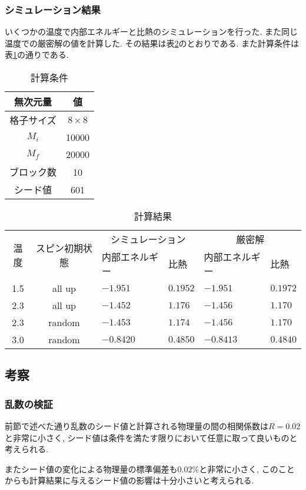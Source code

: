 \subsubsection{シミュレーション結果}
いくつかの温度で内部エネルギーと比熱のシミュレーションを行った.
また同じ温度での厳密解の値を計算した.
その結果は表\ref{tab:5a3}のとおりである.
また計算条件は表\ref{tab:5a2}の通りである.
\begin{table}[h]
\caption{計算条件}
\label{tab:5a2}
\centering
\begin{tabular}{cc}
\hline
無次元量&値\\
\hline \hline
格子サイズ&$8\times 8$\\
$M_i$&10000\\
$M_f$&20000\\
ブロック数&10\\
シード値&601\\
\hline
\end{tabular}
\end{table}
\begin{table}[h]
\caption{計算結果}
\label{tab:5a3}
\centering
\begin{tabular}{cc|ll|ll}
\hline
\multirow{2}{*}{温度}&\multirow{2}{*}{スピン初期状態}&\multicolumn{2}{c|}{シミュレーション}&\multicolumn{2}{c}{厳密解}\\
&&内部エネルギー&比熱&内部エネルギー&比熱\\
\hline \hline
1.5&all up&$-1.951$&$0.1952$&$-1.951$&$0.1972$\\
2.3&all up&$-1.452$&$1.176$&$-1.456$&$1.170$\\
2.3&random&$-1.453$&$1.174$&$-1.456$&$1.170$\\
3.0&random&$-0.8420$&$0.4850$&$-0.8413$&$0.4840$\\
\hline
\end{tabular}
\end{table}
\subsection{考察}
\subsubsection{乱数の検証}
前節で述べた通り乱数のシード値と計算される物理量の間の相関係数は$R=0.02$と非常に小さく,
シード値は条件を満たす限りにおいて任意に取って良いものと考えられる.

またシード値の変化による物理量の標準偏差も$0.02\%$と非常に小さく,
このことからも計算結果に与えるシード値の影響は十分小さいと考えられる.

